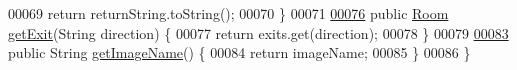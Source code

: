 \begin{DoxyCode}
00069         \textcolor{keywordflow}{return} returnString.toString();
00070     \}
00071 
\hypertarget{Room_8java_source_l00076}{}\hyperlink{classRoom_a384ab8c844e5775f87de24d6c470637e}{00076}     \textcolor{keyword}{public} \hyperlink{classRoom}{Room} \hyperlink{classRoom_a384ab8c844e5775f87de24d6c470637e}{getExit}(String direction) \{
00077         \textcolor{keywordflow}{return} exits.get(direction);
00078     \}
00079 
\hypertarget{Room_8java_source_l00083}{}\hyperlink{classRoom_a8177668df4d8be718812934673c42649}{00083}     \textcolor{keyword}{public} String \hyperlink{classRoom_a8177668df4d8be718812934673c42649}{getImageName}() \{
00084         \textcolor{keywordflow}{return} imageName;
00085     \}
00086 \}
\end{DoxyCode}
